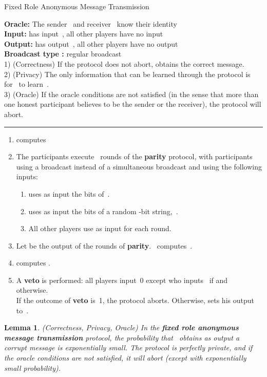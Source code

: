 \documentclass[11pt]{article}
\newtheorem{lemma}[theorem]{Lemma}
\begin{document}
\begin{protocol}\caption{Fixed Role Anonymous Message Transmission}
\label{prot:fr-anon-mes-trans}
{\bf Oracle:} The sender~ and receiver~ know their identity \\
{\bf Input:}  has input~, all other players have no input  \\
{\bf Output:}  has output~, all other players have no output    \\
{\bf Broadcast type :}  regular broadcast\\
1) (Correctness) If the protocol does not abort,  obtains the
correct message. \\
2) (Privacy) The only information that can be learned through the
protocol
is for~ to learn~. \\
3) (Oracle) If the oracle conditions are not satisfied (in the sense
that more than one honest participant  believes to be the sender or
the receiver), the protocol will abort.

\vspace{4pt} \hrule \vspace{4pt}

\begin{enumerate}
\item  computes~
\item The participants execute~ rounds of the  \textbf{parity}
protocol, with participants using a
broadcast instead of a simultaneous broadcast and using the
following inputs:
\begin{enumerate}
\item  uses as input the bits of~.
\item  uses as input the bits of a random -bit string,~.
\item All other players use  as input for each round.
\end{enumerate}
\item Let  be the output of the rounds of \textbf{parity}.  ~computes~.
\item  computes .
\item \label{step:veto} A \textbf{veto} is performed:  all players input~0 except  who inputs~ if   and~ otherwise.  \\
If the outcome of \textbf{veto} is~1, the protocol aborts.
Otherwise,  sets his output to~.
\end{enumerate}
\end{protocol}

\begin{lemma}(Correctness, Privacy, Oracle)
In the \textbf{fixed role anonymous message transmission} protocol,
the probability that~ obtains as output a corrupt message is
exponentially small. The protocol is perfectly private,  and  if the
oracle conditions are not satisfied, it will abort (except with
exponentially small probability).
\end{lemma}
\end{document}
